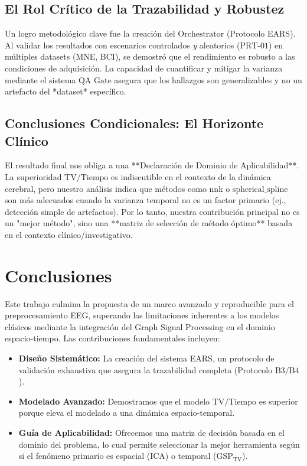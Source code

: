 \documentclass[a4paper, 12pt]{book}
\begin{document}
\subsection{El Rol Crítico de la Trazabilidad y Robustez}
Un logro metodológico clave fue la creación del $\text{Orchestrator}$ (Protocolo EARS). Al validar los resultados con escenarios controlados \emph{y} aleatorios ($\text{PRT-01}$) en múltiples datasets (MNE, BCI), se demostró que el rendimiento es robusto a las condiciones de adquisición. La capacidad de cuantificar y mitigar la varianza mediante el sistema $\text{QA Gate}$ asegura que los hallazgos son generalizables y no un artefacto del *dataset* específico.

\subsection{Conclusiones Condicionales: El Horizonte Clínico}
El resultado final nos obliga a una **Declaración de Dominio de Aplicabilidad**. La superioridad $\text{TV/Tiempo}$ es indiscutible en el contexto de la dinámica cerebral, pero nuestro análisis indica que métodos como $\text{nnk}$ o $\text{spherical\_spline}$ son más adecuados cuando la varianza temporal no es un factor primario (ej., detección simple de artefactos). Por lo tanto, nuestra contribución principal no es un "mejor método", sino una **matriz de selección de método óptimo** basada en el contexto clínico/investigativo.


\section{Conclusiones}
\label{sec:conclusion_final}
Este trabajo culmina la propuesta de un marco avanzado y reproducible para el preprocesamiento EEG, superando las limitaciones inherentes a los modelos clásicos mediante la integración del Graph Signal Processing en el dominio espacio-tiempo. Las contribuciones fundamentales incluyen:

\begin{itemize}
    \item \textbf{Diseño Sistemático:} La creación del sistema EARS, un protocolo de validación exhaustiva que asegura la trazabilidad completa (Protocolo $\text{B3/B4}$).
    \item \textbf{Modelado Avanzado:} Demostramos que el modelo $\text{TV/Tiempo}$ es superior porque eleva el modelado a una dinámica espacio-temporal.
    \item \textbf{Guía de Aplicabilidad:} Ofrecemos una matriz de decisión basada en el dominio del problema, lo cual permite seleccionar la mejor herramienta según si el fenómeno primario es espacial ($\text{ICA}$) o temporal ($\text{GSP}_{\text{TV}}$).
\end{itemize}
\end{document}
